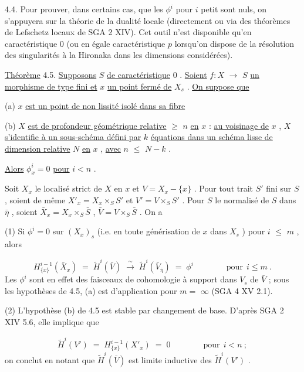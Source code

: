 4.4.  Pour prouver, dans certains cas, que les  $\phi^i$  pour  $i$  petit sont nuls, on s'appuyera sur la théorie de la dualité locale (directement ou via des théorèmes de Lefschetz locaux de SGA 2 XIV). Cet outil n'est disponible qu'en caractéristique 0 (ou en égale caractéristique  $p$ lorsqu'on dispose de la résolution des singularités à la Hironaka dans les dimensions considérées).



\underline{Théorème} 4.5.  \underline{Supposons}  $S$  \underline{de caractéristique} 0 . \underline{Soient}  $f : X$ $\longrightarrow$ $S$  \underline{un morphisme de type fini et}  $x$  \underline{un point fermé de}  $X_s$ . \underline{On suppose que}

(a) $x$  \underline{est un point de non lissité isolé dans sa fibre}

(b) $X$  \underline{est de profondeur géométrique relative} $\geqslant$ $n$ \underline{en}  $x$ : \underline{au voisinage de} $x$ , $X$ \underline{s'identifie à un sous-schéma défini par} $k$ \underline{équations dans un schéma lisse de dimension relative} $N$ \underline{en} $x$ , \underline{avec}  $n$ $\leqslant$ $N-k$ .

\underline{Alors}  $\phi^i_x = 0$  \underline{pour}  $i < n$ .

Soit  $X_x$  le localisé strict de  $X$  en  $x$  et  $V = X_x - \{x\}$  . Pour tout trait  $S'$  fini sur  $S$ , soient de même  $X'_x = X_x \times_S S'$  et  $V' = V \times_S S'$ . Pour  $S$  le normalisé de  $S$  dans  $\bar{\eta}$ , soient  $\bar{X}_x = X_x \times_S \bar{S}$ ,  $\bar{V} = V \times_S \bar{S}$ . On a

(1) Si $\phi^i = 0$  sur  $(X_x)_s$  (i.e. en toute générisation de  $x$  dans  $X_s$ ) pour $i$ $\leqslant$ $m$ , alors

\begin{equation*}
H^{i-1}_{\{x\}}(\bar{X}_x) \;=\; \widetilde{H}^{i}(\bar{V}) \;\xrightarrow{\ \sim\ }\; \widetilde{H}^{i}(\bar{V}_{\bar{\eta}}) \;=\; \phi^i \qquad\qquad \text{pour}\ \ i \leqslant m\ .
\end{equation*}
Les  $\phi^i$  sont en effet des faisceaux de cohomologie à support dans  $V_s$  de  $\bar{V}$ ; sous les hypothèses de 4.5, (a) est d'application pour  $m =$ $\infty$   (SGA 4 XV 2.1).

(2) L'hypothèse (b) de 4.5 est stable par changement de base. D'après SGA 2 XIV 5.6, elle implique que

\begin{equation*}
\widetilde{H}^{i}(V') \;=\; H^{i-1}_{\{x\}}(X'_x) \;=\; 0 \qquad\qquad \text{pour}\ \ i < n\ ;
\end{equation*}
on conclut en notant que  $\widetilde{H}^{i}(\bar{V})$  est limite inductive des  $\widetilde{H}^{i}(V')$  .

